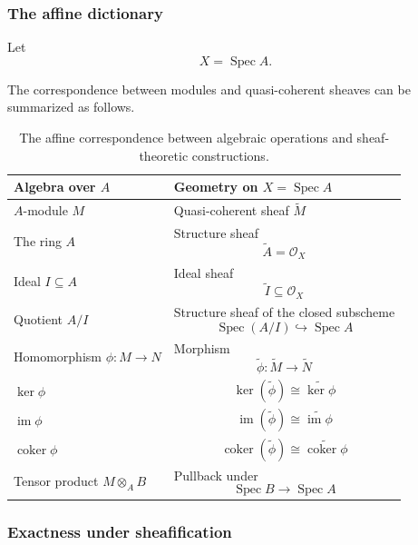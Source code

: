\documentclass[12pt,a4paper]{article}
\DeclareMathOperator{\Spec}{Spec}
\newcommand{\OO}{\mathcal{O}}
\providecommand{\Spec}{\operatorname{Spec}}
\theoremstyle{notespace}
\begin{document}
\subsubsection{The affine dictionary}

Let
\[
X=\Spec A.
\]

The correspondence between modules and quasi-coherent sheaves can be summarized as follows.

\begin{table}[htbp]
	\centering
	\renewcommand{\arraystretch}{1.45}
	\begin{tabular}{|p{6.7cm}|p{7.2cm}|}
		\hline
		\textbf{Algebra over \(A\)}
		&
		\textbf{Geometry on \(X=\Spec A\)}
		\\
		\hline
		\(A\)-module \(M\)
		&
		Quasi-coherent sheaf \(\widetilde M\)
		\\
		\hline
		The ring \(A\)
		&
		Structure sheaf
		\[
		\widetilde A=\OO_X
		\]
		\\
		\hline
		Ideal \(I\subseteq A\)
		&
		Ideal sheaf
		\[
		\widetilde I\subseteq\OO_X
		\]
		\\
		\hline
		Quotient \(A/I\)
		&
		Structure sheaf of the closed subscheme
		\[
		\Spec(A/I)\hookrightarrow\Spec A
		\]
		\\
		\hline
		Homomorphism \(\phi:M\to N\)
		&
		Morphism
		\[
		\widetilde\phi:\widetilde M\to\widetilde N
		\]
		\\
		\hline
		\(\ker\phi\)
		&
		\[
		\ker(\widetilde\phi)\cong\widetilde{\ker\phi}
		\]
		\\
		\hline
		\(\operatorname{im}\phi\)
		&
		\[
		\operatorname{im}(\widetilde\phi)
		\cong
		\widetilde{\operatorname{im}\phi}
		\]
		\\
		\hline
		\(\operatorname{coker}\phi\)
		&
		\[
		\operatorname{coker}(\widetilde\phi)
		\cong
		\widetilde{\operatorname{coker}\phi}
		\]
		\\
		\hline
		Tensor product \(M\otimes_A B\)
		&
		Pullback under
		\[
		\Spec B\longrightarrow\Spec A
		\]
		\\
		\hline
	\end{tabular}
	\caption{The affine correspondence between algebraic operations and sheaf-theoretic constructions.}
\end{table}

\subsubsection{Exactness under sheafification}
\end{document}
